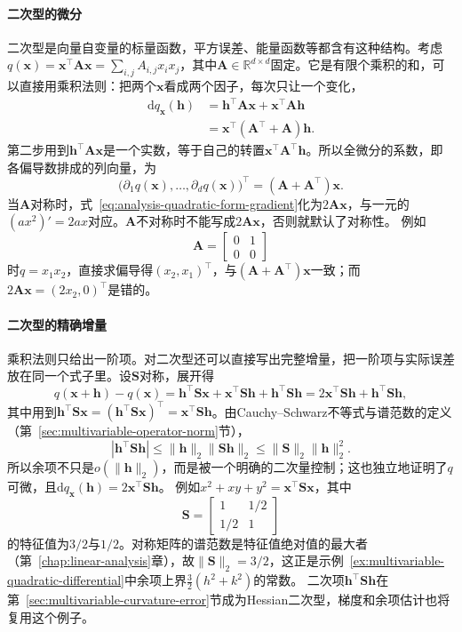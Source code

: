 \paragraph{二次型的微分}
二次型是向量自变量的标量函数，平方误差、能量函数等都含有这种结构。考虑$q(\bm{x})=\bm{x}^{\top}\bm{A}\bm{x}=\sum_{i,j}A_{i,j}x_ix_j$，其中$\bm{A}\in\mathbb{R}^{d\times d}$固定。它是有限个乘积的和，可以直接用乘积法则：把两个$\bm x$看成两个因子，每次只让一个变化，
\begin{align*}
  \mathrm{d}q_{\bm x}(\bm h)
  &=
  \bm h^{\top}\bm{A}\bm{x}
  +\bm{x}^{\top}\bm{A}\bm h\\
  &=
  \bm{x}^{\top}(\bm{A}^{\top}+\bm{A})\bm h.
\end{align*}
第二步用到$\bm h^\top\bm A\bm x$是一个实数，等于自己的转置$\bm x^\top\bm A^\top\bm h$。所以全微分的系数，即各偏导数排成的列向量，为
\begin{equation}
  \bigl(\partial_1q(\bm x),\ldots,\partial_dq(\bm x)\bigr)^\top
  =
  (\bm{A}+\bm{A}^{\top})\bm{x}.
\label{eq:analysis-quadratic-form-gradient}
\end{equation}
当$\bm{A}$对称时，式~\eqref{eq:analysis-quadratic-form-gradient}化为$2\bm{A}\bm{x}$，与一元的$(ax^2)'=2ax$对应。$\bm A$不对称时不能写成$2\bm{A}\bm{x}$，否则就默认了对称性。
例如
\[
 \bm A=\begin{bmatrix}0&1\\0&0\end{bmatrix}
\]
时$q=x_1x_2$，直接求偏导得$(x_2,x_1)^\top$，与$(\bm A+\bm A^\top)\bm x$一致；而$2\bm A\bm x=(2x_2,0)^\top$是错的。

\paragraph{二次型的精确增量}
乘积法则只给出一阶项。对二次型还可以直接写出完整增量，把一阶项与实际误差放在同一个式子里。设$\bm S$对称，展开得
\[
 q(\bm x+\bm h)-q(\bm x)
 =\bm h^\top\bm S\bm x+\bm x^\top\bm S\bm h+\bm h^\top\bm S\bm h
 =2\bm x^\top\bm S\bm h+\bm h^\top\bm S\bm h,
\]
其中用到$\bm h^\top\bm S\bm x=(\bm h^\top\bm S\bm x)^\top=\bm x^\top\bm S\bm h$。由Cauchy--Schwarz不等式与谱范数的定义（第~\ref{sec:multivariable-operator-norm}节），
\[
 |\bm h^\top\bm S\bm h|\leq\lVert\bm h\rVert_2\lVert\bm S\bm h\rVert_2\leq\lVert\bm S\rVert_2\lVert\bm h\rVert_2^2 .
\]
所以余项不只是$o(\lVert\bm h\rVert_2)$，而是被一个明确的二次量控制；这也独立地证明了$q$可微，且$\mathrm dq_{\bm x}(\bm h)=2\bm x^\top\bm S\bm h$。
例如$x^2+xy+y^2=\bm x^\top\bm S\bm x$，其中
\[
 \bm S=\begin{bmatrix}1&1/2\\1/2&1\end{bmatrix}
\]
的特征值为$3/2$与$1/2$。对称矩阵的谱范数是特征值绝对值的最大者（第~\ref{chap:linear-analysis}章），故$\lVert\bm S\rVert_2=3/2$，这正是示例~\ref{ex:multivariable-quadratic-differential}中余项上界$\tfrac32(h^2+k^2)$的常数。
二次项$\bm h^\top\bm S\bm h$在第~\ref{sec:multivariable-curvature-error}节成为Hessian二次型，梯度和余项估计也将复用这个例子。

